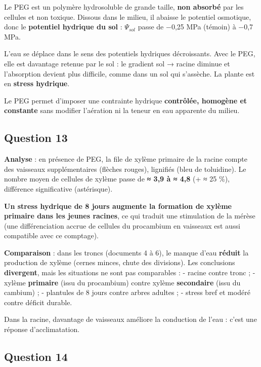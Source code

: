 \documentclass[11pt,a4paper]{article}
\begin{document}
Le PEG est un polymère hydrosoluble de grande taille, \textbf{non absorbé} par les cellules et non toxique. Dissous dans le milieu, il abaisse le potentiel osmotique, donc le \textbf{potentiel hydrique du sol} : \(\Psi_{sol}\) passe de −0,25 MPa (témoin) à −0,7 MPa.

L'eau se déplace dans le sens des potentiels hydriques décroissants. Avec le PEG, elle est davantage retenue par le sol : le gradient sol → racine diminue et l'absorption devient plus difficile, comme dans un sol qui s'assèche. La plante est en \textbf{stress hydrique}.

Le PEG permet d'imposer une contrainte hydrique \textbf{contrôlée, homogène et constante} sans modifier l'aération ni la teneur en eau apparente du milieu.

\hypertarget{question-13}{%
\subsection{Question 13}\label{question-13}}

\textbf{Analyse} : en présence de PEG, la file de xylème primaire de la racine compte des vaisseaux supplémentaires (flèches rouges), lignifiés (bleu de toluidine). Le nombre moyen de cellules de xylème passe de \textbf{≈ 3,9 à ≈ 4,8} (+ ≈ 25 \%), différence significative (astérisque).

\textbf{Un stress hydrique de 8 jours augmente la formation de xylème primaire dans les jeunes racines}, ce qui traduit une stimulation de la mérèse (une différenciation accrue de cellules du procambium en vaisseaux est aussi compatible avec ce comptage).

\textbf{Comparaison} : dans les troncs (documents 4 à 6), le manque d'eau \textbf{réduit} la production de xylème (cernes minces, chute des divisions). Les conclusions \textbf{divergent}, mais les situations ne sont pas comparables :
- racine contre tronc ;
- xylème \textbf{primaire} (issu du procambium) contre xylème \textbf{secondaire} (issu du cambium) ;
- plantules de 8 jours contre arbres adultes ;
- stress bref et modéré contre déficit durable.

Dans la racine, davantage de vaisseaux améliore la conduction de l'eau : c'est une réponse d'acclimatation.

\hypertarget{question-14}{%
\subsection{Question 14}\label{question-14}}
\end{document}
